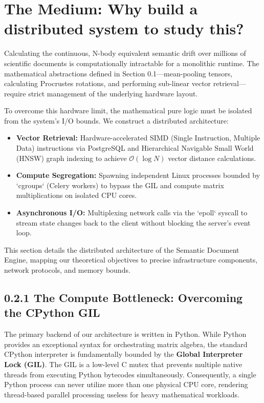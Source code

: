 \section{The Medium: Why build a distributed system to study this?}



Calculating the continuous, N-body equivalent semantic drift over millions of scientific documents is computationally intractable for a monolithic runtime. The mathematical abstractions defined in Section 0.1—mean-pooling tensors, calculating Procrustes rotations, and performing sub-linear vector retrieval—require strict management of the underlying hardware layout.



To overcome this hardware limit, the mathematical pure logic must be isolated from the system's I/O bounds. We construct a distributed architecture:
\begin{itemize}
    \item \textbf{Vector Retrieval:} Hardware-accelerated SIMD (Single Instruction, Multiple Data) instructions via PostgreSQL and Hierarchical Navigable Small World (HNSW) graph indexing to achieve $\mathcal{O}(\log N)$ vector distance calculations.
    \item \textbf{Compute Segregation:} Spawning independent Linux processes bounded by `cgroups` (Celery workers) to bypass the GIL and compute matrix multiplications on isolated CPU cores.
    \item \textbf{Asynchronous I/O:} Multiplexing network calls via the `epoll` syscall to stream state changes back to the client without blocking the server's event loop.
\end{itemize}
This section details the distributed architecture of the Semantic Document Engine, mapping our theoretical objectives to precise infrastructure components, network protocols, and memory bounds.



\subsection*{0.2.1 The Compute Bottleneck: Overcoming the CPython GIL}

The primary backend of our architecture is written in Python. While Python provides an exceptional syntax for orchestrating matrix algebra, the standard CPython interpreter is fundamentally bounded by the \textbf{Global Interpreter Lock (GIL)}. The GIL is a low-level C mutex that prevents multiple native threads from executing Python bytecodes simultaneously. Consequently, a single Python process can never utilize more than one physical CPU core, rendering thread-based parallel processing useless for heavy mathematical workloads.


